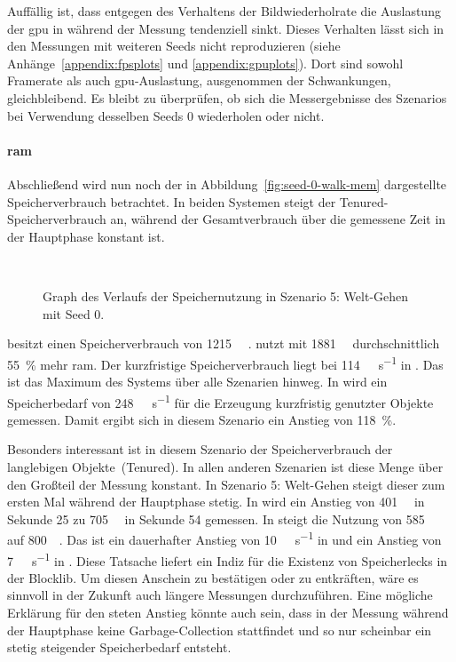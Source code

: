 Auffällig ist, dass entgegen des Verhaltens der Bildwiederholrate die Auslastung der \ac{gpu} in \sysB{} während der Messung tendenziell sinkt. Dieses Verhalten lässt sich in den Messungen mit weiteren Seeds nicht reproduzieren (siehe Anhänge~\vref{appendix:fpsplots} und \vref{appendix:gpuplots}). Dort sind sowohl Framerate als auch \ac{gpu}-Auslastung, ausgenommen der Schwankungen, gleichbleibend. Es bleibt zu überprüfen, ob sich die Messergebnisse des Szenarios bei Verwendung desselben Seeds $0$ wiederholen oder nicht.

\paragraph{\ac{ram}}
Abschließend wird nun noch der in Abbildung~\vref{fig:seed-0-walk-mem} dargestellte Speicherverbrauch betrachtet. In beiden Systemen steigt der Tenured-Speicherverbrauch an, während der Gesamtverbrauch über die gemessene Zeit in der Hauptphase konstant ist.
\begin{figure}[!htbp]
	\\
	\caption{Graph des Verlaufs der Speichernutzung in Szenario 5: Welt-Gehen mit Seed 0.}\label{fig:seed-0-walk-mem}
\end{figure} 
\sysA{} besitzt einen Speicherverbrauch von \SI{1215}{\mega\byte} .\sysB{} nutzt mit \SI{1881}{\mega\byte} durchschnittlich \SI{55}{\percent} mehr \ac{ram}. Der kurzfristige Speicherverbrauch liegt bei \SI{114}{\mega\byte\per\second} in \sysA{}. Das ist das Maximum des Systems über alle Szenarien hinweg. In \sysB{} wird ein Speicherbedarf von \SI{248}{\mega\byte\per\second} für die Erzeugung kurzfristig genutzter Objekte gemessen. Damit ergibt sich in diesem Szenario ein Anstieg von \SI{118}{\percent}. 

Besonders interessant ist in diesem Szenario der Speicherverbrauch der langlebigen Objekte~(Tenured). In allen anderen Szenarien ist diese Menge über den Großteil der Messung konstant.
In Szenario 5: Welt-Gehen steigt dieser zum ersten Mal während der Hauptphase stetig. In \sysA{} wird ein Anstieg von \SI{401}{\mega\byte} in Sekunde 25 zu \SI{705}{\mega\byte} in Sekunde 54 gemessen. In \sysB{} steigt die Nutzung von \SI{585}{\mega\byte} auf \SI{800}{\mega\byte}. Das ist ein dauerhafter Anstieg von \SI{10}{\mega\byte\per\second} in \sysA{} und ein Anstieg von \SI{7}{\mega\byte\per\second} in \sysB{}. Diese Tatsache liefert ein Indiz für die Existenz von Speicherlecks in der Blocklib. Um diesen Anschein zu bestätigen oder zu entkräften, wäre es sinnvoll in der Zukunft auch längere Messungen durchzuführen. Eine mögliche Erklärung für den steten Anstieg könnte auch sein, dass in der Messung während der Hauptphase keine Garbage-Collection stattfindet und so nur scheinbar ein stetig steigender Speicherbedarf entsteht.

